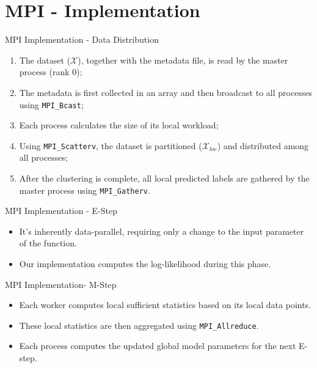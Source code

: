 \section{MPI - Implementation}
    \begin{frame}{MPI Implementation - Data Distribution}
        \centering
        \begin{enumerate}
            \item The dataset ($\mathcal{X}$), together with the metadata file, is read by the master process (rank 0);
            \item The metadata is first collected in an array and then broadcast to all processes using \texttt{MPI\_Bcast};
            \item Each process calculates the size of its local workload;
            \item Using \texttt{MPI\_Scatterv}, the dataset is partitioned ($\mathcal{X}_{loc}$) and distributed among all processes;
            \item After the clustering is complete, all local predicted labels are gathered by the master process using \texttt{MPI\_Gatherv}.
        \end{enumerate}
    \end{frame}
    \begin{frame}{MPI Implementation - E-Step}
        \centering
        \begin{itemize}
            \item It's inherently data-parallel, requiring only a change to the input parameter of the function.
            \item Our implementation computes the log-likelihood during this phase.
        \end{itemize}
    \end{frame}
    \begin{frame}{MPI Implementation- M-Step}
        \centering
        \begin{itemize}
            \item Each worker computes local sufficient statistics based on its local data points.
            \item These local statistics are then aggregated using \texttt{MPI\_Allreduce}.
            \item Each process computes the updated global model parameters for the next E-step.
        \end{itemize}
    \end{frame}
